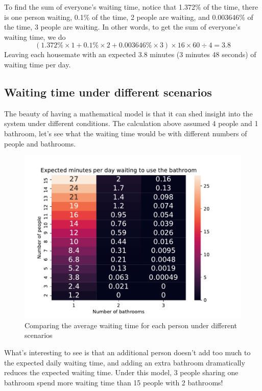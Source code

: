 To find the sum of everyone's waiting time, notice that 1.372\% of the time, there is one person waiting, 0.1\% of the time, 2 people are waiting, and 0.003646\% of the time, 3 people are waiting. In other words, to get the sum of everyone's waiting time, we do
$$ (1.372\% \times 1 + 0.1\% \times 2 + 0.003646\% \times 3) \times 16 \times 60 \div 4 = 3.8 $$
Leaving each housemate with an expected 3.8 minutes (3 minutes 48 seconds) of waiting time per day.

\subsection*{Waiting time under different scenarios}
The beauty of having a mathematical model is that it can shed insight into the system under different conditions. The calculation above assumed 4 people and 1 bathroom, let's see what the waiting time would be with different numbers of people and bathrooms.

\begin{figure}[H]
	\centering
	\includegraphics[scale=1]{../../images/comparison}
	\caption{Comparing the average waiting time for each person under different scenarios}
	\label{fig: comparison}
\end{figure}

What's interesting to see is that an additional person doesn't add too much to the expected daily waiting time, and adding an extra bathroom dramatically reduces the expected waiting time. Under this model, 3 people sharing one bathroom spend more waiting time than 15 people with 2 bathrooms!

